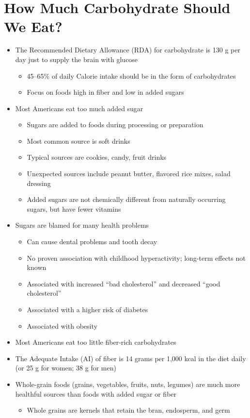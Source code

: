 \documentclass[title={Chapter 4}]{fdsn201notes}
\begin{document}
\section{How Much Carbohydrate Should We Eat?}\label{sec:how-much-carbohydrate-should-we-eat?}
\begin{itemize}
	\item The Recommended Dietary Allowance (RDA) for carbohydrate is 130 g per day just to supply the brain with glucose
	\begin{itemize}
		\item 45--65\% of daily Calorie intake should be in the form of carbohydrates
		\item Focus on foods high in fiber and low in added sugars
	\end{itemize}
	\item Most Americans eat too much added sugar
	\begin{itemize}
		\item Sugars are added to foods during processing or preparation
		\item Most common source is soft drinks
		\item Typical sources are cookies, candy, fruit drinks
		\item Unexpected sources include peanut butter, flavored rice mixes, salad dressing
		\item Added sugars are not chemically different from naturally occurring sugars, but have fewer vitamins
	\end{itemize}
	\item Sugars are blamed for many health problems
	\begin{itemize}
		\item Can cause dental problems and tooth decay
		\item No proven association with childhood hyperactivity; long-term effects not known
		\item Associated with increased ``bad cholesterol'' and decreased ``good cholesterol''
		\item Associated with a higher risk of diabetes
		\item Associated with obesity
	\end{itemize}
	\item Most Americans eat too little fiber-rich carbohydrates
	\item The Adequate Intake (AI) of fiber is 14 grams per 1,000 kcal in the diet daily (or 25 g for women; 38 g for men)
	\item Whole-grain foods (grains, vegetables, fruits, nuts, legumes) are much more healthful sources than foods with added sugar or fiber
	\begin{itemize}
		\item Whole grains are kernels that retain the bran, endosperm, and germ
	\end{itemize}
\end{itemize}
\end{document}
